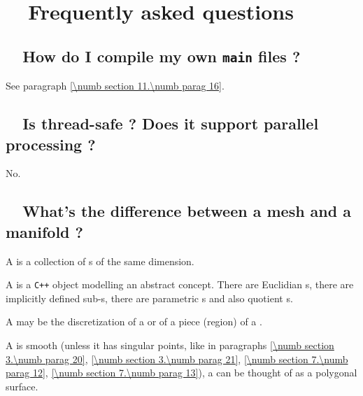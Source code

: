
\chapter {~~{Frequently asked questions}}\label{\numb section 13}

\section{~~How do I compile my own {\tt main} files ?}\label{\numb section 13.\numb parag 1}

See paragraph \ref{\numb section 11.\numb parag 16}.


\section{~~Is {\maniFEM} thread-safe ? Does it support parallel processing ?}
\label{\numb section 13.\numb parag 2}

No.


\section{~~What's the difference between a mesh and a manifold ?}
\label{\numb section 13.\numb parag 3}

A {\small\tt{}} is a collection of {\small\tt{}}s of the
same dimension.

A {\small\tt{}} is a {\tt C++} object modelling an abstract concept.
There are Euclidian {\small\tt{}}s, there are implicitly defined
sub-{\small\tt{}}s, there are parametric {\small\tt{}}s
and also quotient {\small\tt{}}s.

A {\small\tt{}} may be the discretization of a {\small\tt{}}
or of a piece (region) of a {\small\tt{}}.

A {\small\tt{}} is smooth (unless it has singular points, like in 
paragraphs \ref{\numb section 3.\numb parag 20}, \ref{\numb section 3.\numb parag 21},
\ref{\numb section 7.\numb parag 12}, \ref{\numb section 7.\numb parag 13}),
a {\small\tt{}} can be thought of as a polygonal surface.

